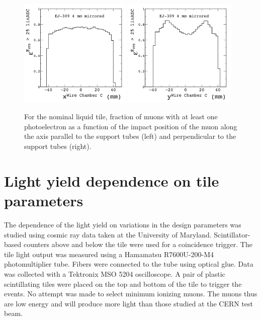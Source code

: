 \documentclass[review]{elsarticle}
\begin{document}
\begin{figure}[h]
\centering\includegraphics[width=0.48\textwidth]{./figures/fiducial2.png}
\centering\includegraphics[width=0.48\textwidth]{./figures/fiducial3.png}
\caption{For the nominal liquid tile, fraction of muons with at least
  one photoelectron as a function of the impact position of the muon along the
  axis parallel to the support tubes (left) and perpendicular to the
  support tubes (right).
}
\label{fig:fiducial}
\end{figure}

\section{Light yield dependence on tile parameters}

The dependence of the light yield on variations in the design
parameters was studied using cosmic ray data taken at the University
of Maryland. Scintillator-based counters above and below the tile
were used for a coincidence trigger. The tile light output was measured using a
Hamamatsu R7600U-200-M4 photomultiplier tube. Fibers were connected
to the tube using optical glue. Data was collected with a Tektronix
MSO 5204 oscilloscope. A pair of plastic scintillating tiles
were placed on the top and bottom of the tile to trigger the events. 
No attempt was made to select minimum ionizing
muons. The muons thus are low energy and will produce more light than
those studied at the CERN test beam.
\end{document}
